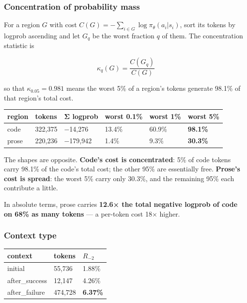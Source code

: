 \documentclass[
  11pt,
]{article}
\begin{document}
\hypertarget{concentration-of-probability-mass}{%
\subsubsection{Concentration of probability
mass}\label{concentration-of-probability-mass}}

For a region \(G\) with cost
\(C(G) = -\sum_{i\in G}\log\pi_\theta(a_i|s_i)\), sort its tokens by
logprob ascending and let \(G_{q}\) be the worst fraction \(q\) of them.
The concentration statistic is

\[\kappa_q(G) = \frac{C(G_q)}{C(G)}\]

so that \(\kappa_{0.05} = 0.981\) means the worst 5\% of a region's
tokens generate 98.1\% of that region's total cost.

\begin{longtable}[]{@{}llllll@{}}
\toprule
region & tokens & Σ logprob & worst 0.1\% & worst 1\% & worst 5\% \\
\midrule
\endhead
code & 322,375 & −14,276 & 13.4\% & 60.9\% & \textbf{98.1\%} \\
prose & 220,236 & −179,942 & 1.4\% & 9.3\% & \textbf{30.3\%} \\
\bottomrule
\end{longtable}

The shapes are opposite. \textbf{Code's cost is concentrated}: 5\% of
code tokens carry 98.1\% of the code's total cost; the other 95\% are
essentially free. \textbf{Prose's cost is spread}: the worst 5\% carry
only 30.3\%, and the remaining 95\% each contribute a little.

In absolute terms, prose carries \textbf{12.6× the total negative
logprob of code on 68\% as many tokens} --- a per-token cost 18× higher.

\hypertarget{context-type}{%
\subsubsection{Context type}\label{context-type}}

\begin{longtable}[]{@{}lll@{}}
\toprule
context & tokens & \(R_{-2}\) \\
\midrule
\endhead
initial & 55,736 & 1.88\% \\
after\_success & 12,147 & 4.26\% \\
after\_failure & 474,728 & \textbf{6.37\%} \\
\bottomrule
\end{longtable}
\end{document}
